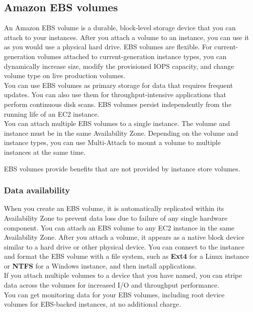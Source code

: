 \documentclass[12pt, letterpaper, twoside]{article}
\begin{document}
\subsection{Amazon EBS volumes}
An Amazon EBS volume is a durable, block-level storage device that you can attach to your instances. After you attach a volume to an 
instance, you can use it as you would use a physical hard drive. EBS volumes are flexible. For current-generation volumes attached to 
current-generation instance types, you can dynamically increase size, modify the provisioned IOPS capacity, and change volume type on 
live production volumes.\\

You can use EBS volumes as primary storage for data that requires frequent updates. You can also use them for throughput-intensive applications 
that perform continuous disk scans. EBS volumes persist independently from the running life of an EC2 instance.\\

You can attach multiple EBS volumes to a single instance. The volume and instance must be in the same Availability Zone. Depending on 
the volume and instance types, you can use Multi-Attach to mount a volume to multiple instances at the same time.

EBS volumes provide benefits that are not provided by instance store volumes.

\subsubsection{Data availability}
When you create an EBS volume, it is automatically replicated within its Availability Zone to prevent data loss due to failure of any
single hardware component. You can attach an EBS volume to any EC2 instance in the same Availability Zone. After you attach a volume, 
it appears as a native block device similar to a hard drive or other physical device.
You can connect to the instance and format the EBS volume with a file system, such as \textbf{Ext4} for a Linux instance or \textbf{NTFS} 
for a Windows instance, and then install applications.\\

If you attach multiple volumes to a device that you have named, you can stripe data across the volumes for increased I/O and throughput 
performance.\\
You can get monitoring data for your EBS volumes, including root device volumes for EBS-backed instances, at no additional charge.\\
\end{document}
